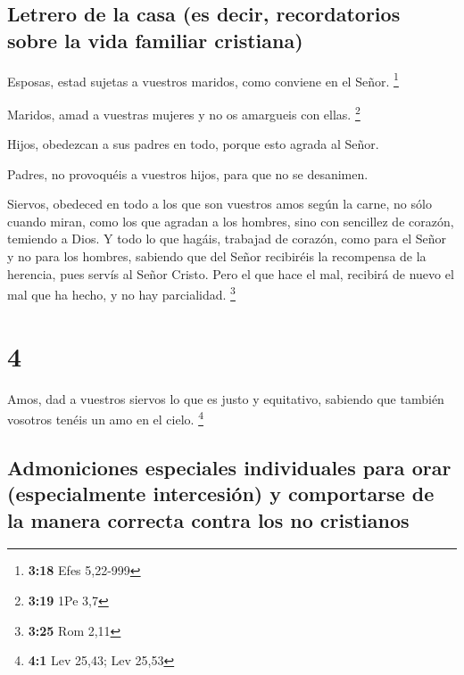 \hypertarget{letrero-de-la-casa-es-decir-recordatorios-sobre-la-vida-familiar-cristiana}{%
\subsection{Letrero de la casa (es decir, recordatorios sobre la vida
familiar
cristiana)}\label{letrero-de-la-casa-es-decir-recordatorios-sobre-la-vida-familiar-cristiana}}

 Esposas, estad sujetas a vuestros maridos, como conviene
en el Señor. \footnote{\textbf{3:18} Efes 5,22-999}

 Maridos, amad a vuestras mujeres y no os amargueis con
ellas. \footnote{\textbf{3:19} 1Pe 3,7}

 Hijos, obedezcan a sus padres en todo, porque esto
agrada al Señor.

 Padres, no provoquéis a vuestros hijos, para que no se
desanimen.

 Siervos, obedeced en todo a los que son vuestros amos
según la carne, no sólo cuando miran, como los que agradan a los
hombres, sino con sencillez de corazón, temiendo a Dios. 
Y todo lo que hagáis, trabajad de corazón, como para el Señor y no para
los hombres,  sabiendo que del Señor recibiréis la
recompensa de la herencia, pues servís al Señor Cristo. 
Pero el que hace el mal, recibirá de nuevo el mal que ha hecho, y no hay
parcialidad. \footnote{\textbf{3:25} Rom 2,11}

\hypertarget{section-3}{%
\section{4}\label{section-3}}

 Amos, dad a vuestros siervos lo que es justo y
equitativo, sabiendo que también vosotros tenéis un amo en el cielo.
\footnote{\textbf{4:1} Lev 25,43; Lev 25,53}

\hypertarget{admoniciones-especiales-individuales-para-orar-especialmente-intercesiuxf3n-y-comportarse-de-la-manera-correcta-contra-los-no-cristianos}{%
\subsection{Admoniciones especiales individuales para orar
(especialmente intercesión) y comportarse de la manera correcta contra
los no
cristianos}\label{admoniciones-especiales-individuales-para-orar-especialmente-intercesiuxf3n-y-comportarse-de-la-manera-correcta-contra-los-no-cristianos}}

